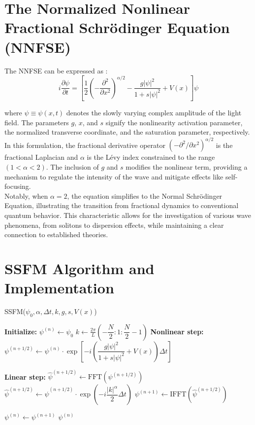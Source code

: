 \documentclass[8pt, a4paper, twocolumn]{article}
\begin{document}
\section{The Normalized Nonlinear Fractional Schrödinger Equation (NNFSE)}

The NNFSE can be expressed as \cite{Huang:17}:
\begin{equation}
    i \frac{\partial \psi}{\partial t} = \left[ \frac{1}{2} \left( - \frac{\partial^2}
	{\partial x^2}\right)^{\alpha/2} - \frac{g|\psi|^2}{1 + s|\psi|^2} + V(x) \right] \psi
\end{equation}

where $\psi \equiv \psi(x, t)$ denotes the slowly varying complex amplitude of the light field. The parameters $g$, $x$, and $s$ 
signify the nonlinearity activation parameter, the normalized transverse coordinate, and the 
saturation parameter, respectively. In this formulation, the fractional derivative operator 
$ (- \partial^2/\partial x^2)^{\alpha/2}$ is the fractional Laplacian and $\alpha$ is the Lévy index constrained to the range
$(1 < \alpha < 2)$. The inclusion of $g$ and $s$ modifies the nonlinear term, providing a 
mechanism to regulate the intensity of the wave and mitigate effects like self-focusing.\\

Notably, when $\alpha=2$, the equation simplifies to the Normal Schrödinger Equation, illustrating the 
transition from fractional dynamics to conventional quantum behavior. This characteristic allows for the 
investigation of various wave phenomena, from solitons to dispersion effects, while maintaining a clear 
connection to established theories.


\section{SSFM Algorithm and Implementation}

\begin{algorithm}
\caption{SSFM($\psi_0, \alpha, \Delta t, k, g, s, V(x)$)}
\begin{algorithmic}[1]\doublespacing
\State \textbf{Initialize:} $\psi^{(n)} \gets \psi_0$
\State $k \gets \frac{2\pi}{L}\left(-\dfrac{N}{2}:1:\dfrac{N}{2} - 1\right)$
	\State \textbf{Nonlinear step:}
	\State $\psi^{(n + 1/2)} \gets \psi^{(n)} \cdot \exp\left[-i \left(\dfrac{g|\psi|^2}{1 + s|\psi|^2} + V(x)\right) \Delta t\right]$
	
	\State \textbf{Linear step:}
	\State $\hat{\psi}^{(n + 1/2)} \gets \text{FFT}(\psi^{(n + 1/2)})$ 
	\State $\hat{\psi}^{(n + 1/2)} \gets \hat{\psi}^{(n + 1/2)} \cdot \exp\left(-i \dfrac{|k|^\alpha}{2} \Delta t\right)$
	\State $\psi^{(n + 1)} \gets \text{IFFT}(\hat{\psi}^{(n + 1/2)})$
	
	\State $\psi^{(n)} \gets \psi^{(n + 1)}$ 
\EndFor
\State \Return $\psi^{(n)}$
\end{algorithmic}
\end{algorithm}
\end{document}
